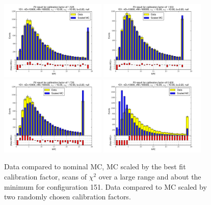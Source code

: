 \begin{figure}[htbp]
\begin{center}
\includegraphics[width=0.45\textwidth]{../FIGURES/151/FIG_Fit_result_for_calibration_factor_of_1_525.pdf} 
\includegraphics[width=0.45\textwidth]{../FIGURES/151/FIG_Fit_result_for_calibration_factor_of_1_533.pdf} 
\includegraphics[width=0.45\textwidth]{../FIGURES/151/FIG_Fit_result_for_calibration_factor_of_1_720.pdf} 
\includegraphics[width=0.45\textwidth]{../FIGURES/151/FIG_Fit_result_for_calibration_factor_of_0_820.pdf} 
\caption{Data compared to nominal MC, MC scaled by the best fit calibration factor, scans of $\chi^2$ over a large range and about the minimum for configuration 151. Data compared to MC scaled by two randomly chosen calibration factors.} 
\label{tab:best_151} 
\end{center} \end{figure} 

